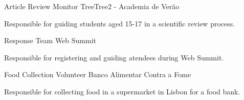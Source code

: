 

\begin{cventries}
  \cventryshort
    {Article Review Monitor} %
    {TreeTree2 - Academia de Verão} %
    {} %
    {} %
    {
      \begin{cvitems} %
        \item {Responsible for guiding students aged 15-17 in a scientific review process.}
      \end{cvitems} 
    }
    
  \cventryshort
    {Response Team} %
    {Web Summit} %
    {} %
    {} %
    {
      \begin{cvitems} %
        \item {Responsible for registering and guiding atendees during Web Summit.}
      \end{cvitems} 
    }

  \cventryshort
    {Food Collection Volunteer} %
    {Banco Alimentar Contra a Fome} %
    {} %
    {} %
    {
      \begin{cvitems} %
        \item {Responsible for collecting food in a supermarket in Lisbon for a food bank.}
      \end{cvitems} 
    }

\end{cventries}
